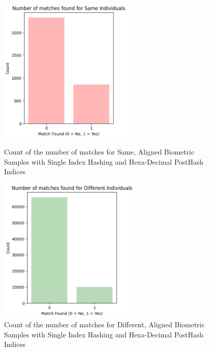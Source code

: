 \begin{enumerate}
    \begin{figure}[H]
        \centering
        \begin{minipage}[b]{0.48\linewidth}
            \centering
            \includegraphics[width=\linewidth,height=7cm,keepaspectratio]{latex-img/d4same.png}
            \caption{Count of the number of matches for Same, Aligned Biometric Samples with Single Index Hashing and Hexa-Decimal PostHash Indices}
            \label{mu_same}
        \end{minipage}
        \hfill
        \begin{minipage}[b]{0.48\linewidth}
            \centering
            \includegraphics[width=\linewidth,height=7cm,keepaspectratio]{latex-img/d4diff.png}
            \caption{Count of the number of matches for Different, Aligned Biometric Samples with Single Index Hashing and Hexa-Decimal PostHash Indices}
            \label{mu_diff}
        \end{minipage}
    \end{figure}
\end{enumerate}

